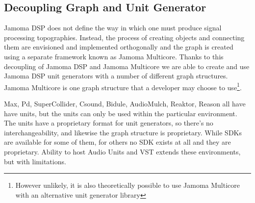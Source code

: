 \documentclass[twoside,a4paper]{article}
\begin{document}

\subsection{Decoupling Graph and Unit Generator} %

Jamoma DSP does not define the way in which one must produce signal processing topographies.  Instead, the process of creating objects and connecting them are envisioned and implemented orthogonally and the graph is created using a separate framework known as Jamoma Multicore.  Thanks to this decoupling of Jamoma DSP and Jamoma Multicore we are able to create and use Jamoma DSP unit generators with a number of different graph structures.  Jamoma Multicore is one graph structure that a developer may choose to use\footnote{However unlikely, it is also theoretically possible to use Jamoma Multicore with an alternative unit generator library}.

Max, Pd, SuperCollider, Csound, Bidule, AudioMulch, Reaktor, Reason all have have units, but the units can only be used within the particular environment. The units have a proprietary format for unit generators, so there's no interchangeability, and likewise the graph structure is proprietary. While SDKs are available for some of them, for others no SDK exists at all and they are proprietary. Ability to host Audio Units and VST extends these environments, but with limitations.
\end{document}
